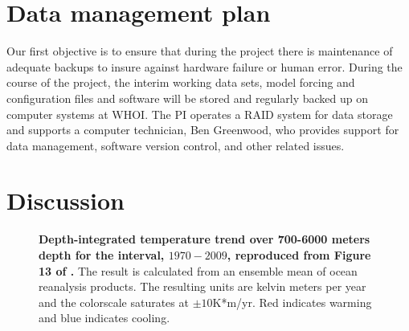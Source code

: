 \documentclass[authoryear,round,12pt]{article}
\begin{document}
\section{Data management plan}

Our first objective is to ensure that during the project there is maintenance of adequate backups to insure against hardware failure or human error. During the course of the project, the interim working data sets, model forcing and configuration files and software will be stored and regularly backed up on computer systems at WHOI. The PI operates a RAID system for data storage and supports a computer technician, Ben Greenwood, who provides support for data management, software version control, and other related issues.

\section{Discussion}
\label{sec:discussion}

\begin{figure}%
\begin{center}
\caption{{\bf Depth-integrated temperature trend over 700-6000 meters depth for the interval, $1970-2009$, reproduced from Figure 13 of \citet{Palmer-Roberts-2017:Ocean}.} The result is calculated from an ensemble mean of ocean reanalysis products. The resulting units are kelvin meters per year and the colorscale saturates at $\pm 10$K*m/yr. Red indicates warming and blue indicates cooling.}
\end{center} 
\end{figure}
\end{document}
